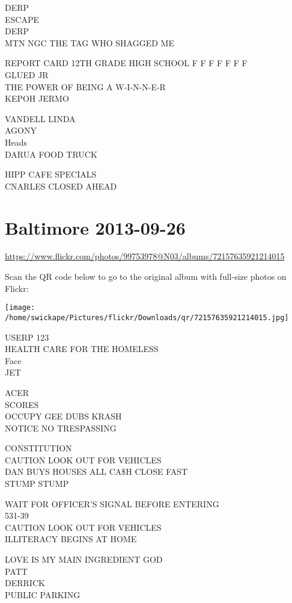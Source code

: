 \documentclass[10pt,letterpaper]{article}
\begin{document}
DERP\\
ESCAPE\\
DERP\\
MTN NGC THE TAG WHO SHAGGED ME

REPORT CARD 12TH GRADE HIGH SCHOOL F F F F F F F\\
GLUED JR\\
THE POWER OF BEING A W{-}I{-}N{-}N{-}E{-}R\\
KEPOH JERMO

VANDELL LINDA\\
AGONY\\
Heads\\
DARUA FOOD TRUCK

HIPP CAFE SPECIALS\\
CNARLES CLOSED AHEAD


\section*{Baltimore 2013-09-26}

\url{https://www.flickr.com/photos/99753978@N03/albums/72157635921214015}

Scan the QR code below to go to the original album with full-size photos on Flickr:

\texttt{[image: /home/swickape/Pictures/flickr/Downloads/qr/72157635921214015.jpg]}


USERP 123\\
HEALTH CARE FOR THE HOMELESS\\
Face\\
JET

ACER\\
SCORES\\
OCCUPY GEE DUBS KRASH\\
NOTICE NO TRESPASSING

CONSTITUTION\\
CAUTION LOOK OUT FOR VEHICLES\\
DAN BUYS HOUSES ALL CA\$H CLOSE FAST\\
STUMP STUMP

WAIT FOR OFFICER'S SIGNAL BEFORE ENTERING\\
531{-}39\\
CAUTION LOOK OUT FOR VEHICLES\\
ILLITERACY BEGINS AT HOME

LOVE IS MY MAIN INGREDIENT GOD\\
PATT\\
DERRICK\\
PUBLIC PARKING
\end{document}

